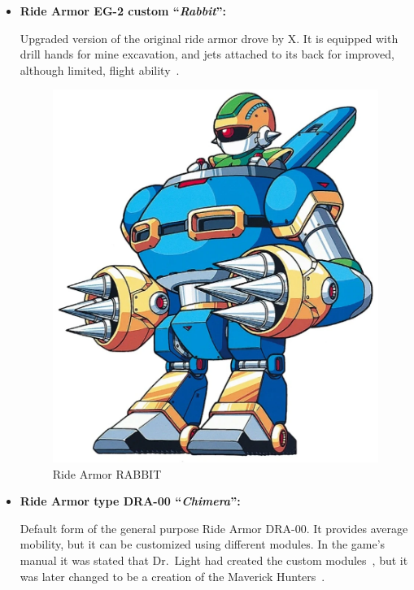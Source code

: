 \begin{itemize}
	\item \hypertarget{vehicle:Ride_Armor_Rabbit}{\textbf{Ride Armor EG-2 custom ``\textit{Rabbit}'':}}
	Upgraded version of the original ride armor drove by X. It is  equipped with drill hands for mine excavation, and jets attached to its back for improved, although limited, flight ability~\cite{wayback:X2_resources}. 
	\begin{figure}[htp]
		\centering
		\includegraphics[height=\portraitsize]{figures/X2/Enemies/Ride_armor_RABBIT.png}
		\caption{Ride Armor RABBIT}
	\end{figure}
	
	\item \hypertarget{vehicle:Ride_Armor_Chimera}{\textbf{Ride Armor type DRA-00 ``\textit{Chimera}'':}} Default form of the general purpose Ride Armor DRA-00. It provides average mobility, but it can be customized using different modules. In the game's manual it was stated that Dr.~Light had created the custom modules~\cite{X3:Manual}, but it was later changed to be a creation of the Maverick Hunters~\cite{book:Compendium}.
	

\end{itemize}
